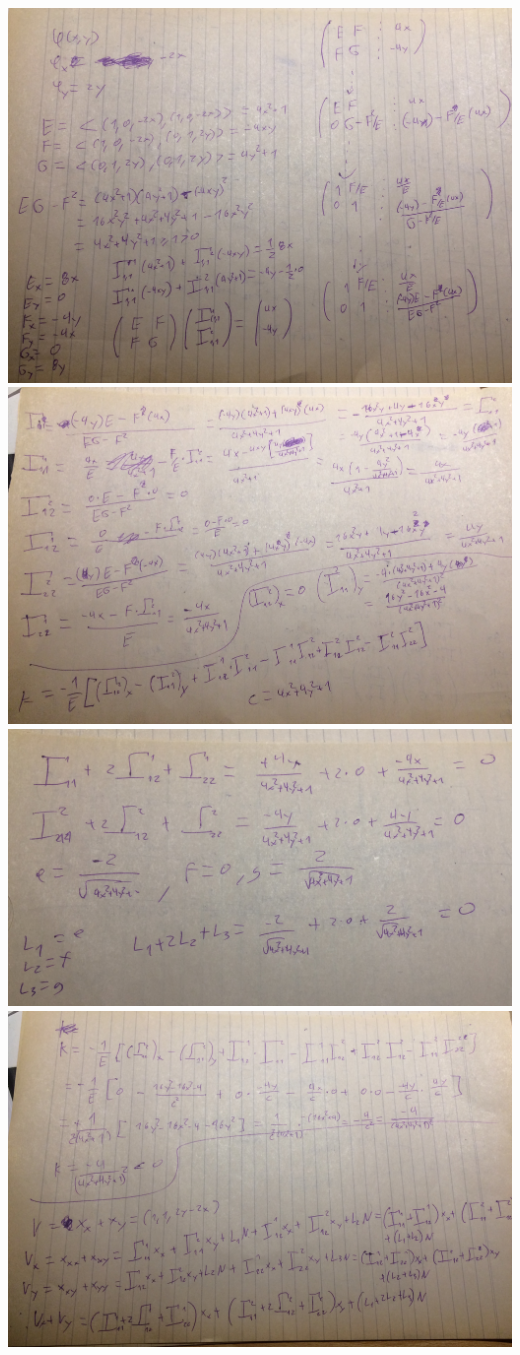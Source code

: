 \includegraphics{img/IMG_5988.JPG}
\includegraphics{img/IMG_5989.JPG}
\includegraphics{img/IMG_5990.JPG}
\includegraphics{img/IMG_5991.JPG}
